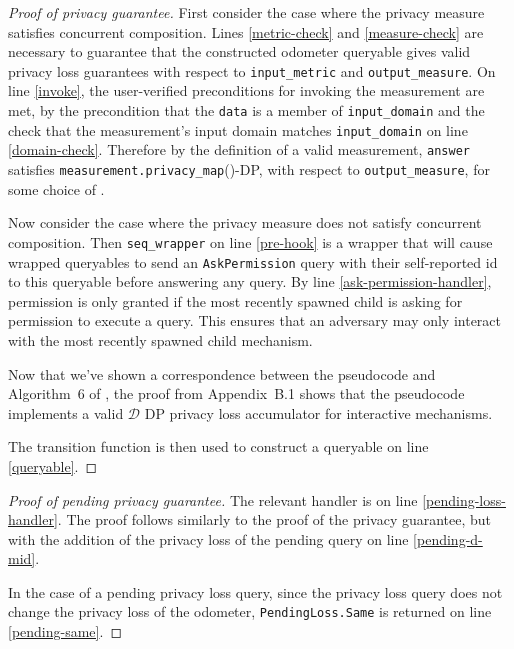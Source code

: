 \documentclass{article}
\begin{document}
\begin{proof}[Proof of privacy guarantee]
    First consider the case where the privacy measure satisfies concurrent composition.
    Lines \ref{metric-check} and \ref{measure-check} are necessary to guarantee that the constructed odometer queryable 
    gives valid privacy loss guarantees with respect to \texttt{input\_metric} and \texttt{output\_measure}.
    On line \ref{invoke}, the user-verified preconditions for invoking the measurement are met,
    by the precondition that the \texttt{data} is a member of \texttt{input\_domain}
    and the check that the measurement's input domain matches \texttt{input\_domain} on line \ref{domain-check}.
    Therefore by the definition of a valid measurement,
    \texttt{answer} satisfies \texttt{measurement.privacy\_map}(\din)-DP, with respect to \texttt{output\_measure}, 
    for some choice of \din.

    Now consider the case where the privacy measure does not satisfy concurrent composition.
    Then \texttt{seq\_wrapper} on line \ref{pre-hook} is a wrapper that will cause wrapped queryables 
    to send an \texttt{AskPermission} query with their self-reported id to this queryable before answering any query.
    By line \ref{ask-permission-handler}, permission is only granted 
    if the most recently spawned child is asking for permission to execute a query.
    This ensures that an adversary may only interact with the most recently spawned child mechanism.
    
    
    Now that we've shown a correspondence between the pseudocode and Algorithm~6 of \cite{haney2023concurrentcompositioninteractivedifferential},
    the proof from Appendix~B.1 shows that the pseudocode implements a valid $\mathcal{D}$ DP privacy loss accumulator for interactive mechanisms.

    The transition function is then used to construct a queryable on line \ref{queryable}.
\end{proof}

\begin{proof}[Proof of pending privacy guarantee]
    The relevant handler is on line \ref{pending-loss-handler}.
    The proof follows similarly to the proof of the privacy guarantee,
    but with the addition of the privacy loss of the pending query on line \ref{pending-d-mid}.
    
    In the case of a pending privacy loss query,
    since the privacy loss query does not change the privacy loss of the odometer,
    \texttt{PendingLoss.Same} is returned on line \ref{pending-same}.
\end{proof}



\end{document}
